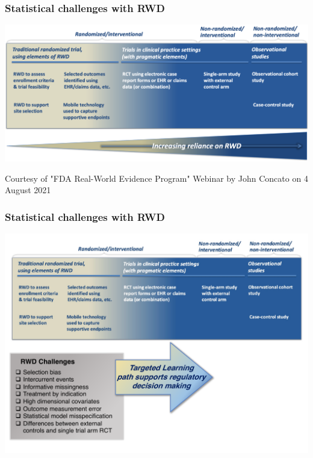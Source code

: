 \documentclass[t]{beamer}
\begin{document}

\begin{frame}
\frametitle{Statistical challenges with RWD}
\vspace{20pt}
\begin{center}
\includegraphics[width=\textwidth]{figures/john_slide8_figure.png}
\end{center}
\vspace{35pt}
\tiny{Courtesy of "FDA Real-World Evidence Program" Webinar by John Concato on 4 August 2021}
\end{frame}

\begin{frame}
\frametitle{Statistical challenges with RWD}
\vspace{-18pt}
\begin{center}
\includegraphics[width=1.02\textwidth]{figures/TLpath1_edit.pdf}
\end{center}
\end{frame}
\end{document}
